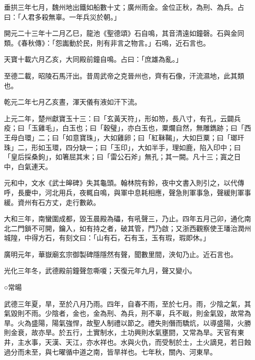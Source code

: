 \begin{pinyinscope}
 垂拱三年七月，魏州地出鐵如船數十丈；廣州雨金。金位正秋，為刑、為兵。占曰：「人君多殺無辜。一年兵災於朝。」



 開元二十三年十二月乙巳，龍池《聖德頌》石自鳴，其音清遠如鐘磬。石與金同類。《春秋傳》：「怨讟動於民，則有非言之物言。」石鳴，近石言也。



 天寶十載六月乙亥，大同殿前鐘自鳴。占曰：「庶雄為亂。」



 至德二載，昭陵石馬汗出。昔周武帝之克晉州也，齊有石像，汗流濕地，此其類也。



 乾元二年七月乙亥晝，渾天儀有液如汗下流。



 上元二年，楚州獻寶玉十三：曰「玄黃天符」，形如笏，長八寸，有孔，云闢兵疫；曰「玉雞毛」，白玉也；曰「穀璧」，亦白玉也，粟爛自然，無雕鐫跡；曰「西王母白環」二；曰「如意寶珠」，大如雞卵；曰「紅靺鞨」，大如巨粟；曰「瑯玕珠」二，形如玉環，四分缺一；曰「玉印」，大如半手，理如鹿，陷入印中；曰「皇后採桑鉤」，如箸屈其末；曰「雷公石斧」無孔；其一闕。凡十三；寘之日中，白氣連天。



 元和中，文水《武士皞碑》失其龜頭。翰林院有鈴，夜中文書入則引之，以代傳呼，長慶中，河北用兵，夜輒自鳴，與軍中息耗相應，聲急則軍事急，聲緩則軍事緩。資州有石方丈，走行數畝。



 大和三年，南蠻圍成都，毀玉晨殿為礧，有吼聲三，乃止。四年五月己卯，通化南北二門鎖不可開，鑰入，如有持之者，破其管，門乃啟；又浙西觀察使王璠治潤州城隍，中得方石，有刻文曰：「山有石，石有玉，玉有瑕，瑕即休。」



 廣明元年，華嶽廟玄宗御製碑隱隱然有聲，聞數里間，浹旬乃止。近石言也。



 光化三年冬，武德殿前鐘聲忽嘶嗄；天復元年九月，聲又變小。



 ○常暘



 武德三年夏，旱，至於八月乃雨。四年，自春不雨，至於七月。雨，少陰之氣，其氣毀則不雨。少陰者，金也，金為刑、為兵，刑不辜，兵不戢，則金氣毀，故常為旱。火為盛陽，陽氣強悍，故聖人制禮以節之。禮失則僭而驕炕，以導盛陽，火勝則金衰，故亦旱。於五行，土實制水，土功興則水氣壅閼，又常為旱。天官有東井，主水事，天漢、天江，亦水祥也。水與火仇，而受制於土，土火謫見，若日蝕過分而未至，與七曜循中道之南，皆旱祥也。七年秋，關內、河東旱。




\end{pinyinscope}
